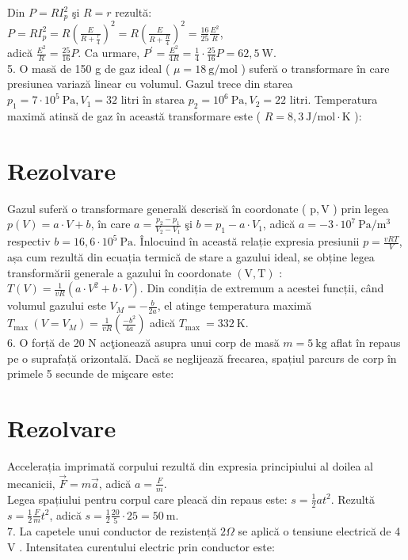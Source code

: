 Din $P=R I_{p}^{2}$ şi $R=r$ rezultă:\\
$P=R I_{p}^{2}=R\left(\frac{E}{R+\frac{r}{4}}\right)^{2}=R\left(\frac{E}{R+\frac{R}{4}}\right)^{2}=\frac{16}{25} \frac{E^{2}}{R}$,\\
adică $\frac{E^{2}}{R}=\frac{25}{16} P$. Ca urmare, $P^{\prime}=\frac{E^{2}}{4 R}=\frac{1}{4} \cdot \frac{25}{16} P=62,5 \mathrm{~W}$.\\
5. O masă de 150 g de gaz ideal ( $\mu=18 \mathrm{~g} / \mathrm{mol}$ ) suferă o transformare în care presiunea variază linear cu volumul. Gazul trece din starea $p_{1}=7 \cdot 10^{5} \mathrm{~Pa}, V_{1}=32$ litri în starea $p_{2}=10^{6} \mathrm{~Pa}, V_{2}=22$ litri. Temperatura maximă atinsă de gaz în această transformare este ( $R=8,3 \mathrm{~J} / \mathrm{mol} \cdot \mathrm{K}$ ):

\section*{Rezolvare}
Gazul suferă o transformare generală descrisă în coordonate ( $\mathrm{p}, \mathrm{V}$ ) prin legea $p(V)=a \cdot V+b$, în care $a=\frac{p_{2}-p_{1}}{V_{2}-V_{1}}$ şi $b=p_{1}-a \cdot V_{1}$, adică $a=-3 \cdot 10^{7} \mathrm{~Pa} / \mathrm{m}^{3}$ respectiv $b=16,6 \cdot 10^{5} \mathrm{~Pa}$. Înlocuind în această relație expresia presiunii $p=\frac{v R T}{V}$, așa cum rezultă din ecuația termică de stare a gazului ideal, se obține legea transformării generale a gazului în coordonate $(\mathrm{V}, \mathrm{T})$ : $T(V)=\frac{1}{v R}\left(a \cdot V^{2}+b \cdot V\right)$. Din condiția de extremum a acestei funcții, când volumul gazului este $V_{M}=-\frac{b}{2 a}$, el atinge temperatura maximă $T_{\text {max }}\left(V=V_{M}\right)=\frac{1}{v R}\left(\frac{-b^{2}}{4 a}\right)$ adică $T_{\text {max }}=332 \mathrm{~K}$.\\
6. O forță de 20 N acţionează asupra unui corp de masă $m=5 \mathrm{~kg}$ aflat în repaus pe o suprafață orizontală. Dacă se neglijează frecarea, spațiul parcurs de corp în primele 5 secunde de mişcare este:

\section*{Rezolvare}
Accelerația imprimată corpului rezultă din expresia principiului al doilea al mecanicii, $\vec{F}=m \vec{a}$, adică $a=\frac{F}{m}$.\\
Legea spațiului pentru corpul care pleacă din repaus este: $s=\frac{1}{2} a t^{2}$. Rezultă $s=\frac{1}{2} \frac{F}{m} t^{2}$, adică $s=\frac{1}{2} \frac{20}{5} \cdot 25=50 \mathrm{~m}$.\\
7. La capetele unui conductor de rezistență $2 \Omega$ se aplică o tensiune electrică de 4 V . Intensitatea curentului electric prin conductor este:

